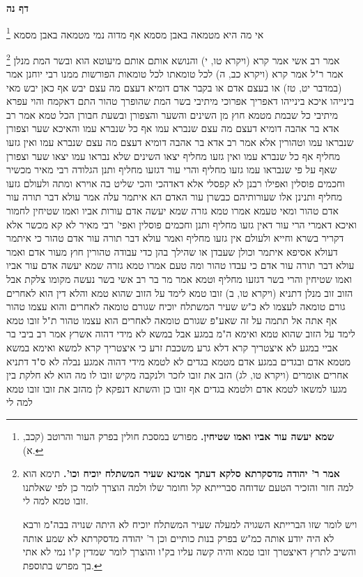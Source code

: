 \documentclass[12pt, openany]{book}
\newcommand{\sethebfont}{
\fontsize{10.5pt}{21.0pt} \selectfont
}
\newcommand{\twocol}[1]{
	{\sethebfont \begin{multicols}{2}
			#1
	\end{multicols}}	
}
\newcommand{\sectname}{}
\newcommand{\newsection}[1]{
	\addcontentsline{toc}{section}{#1}
	\renewcommand{\sectname}{#1}	
	\vspace{-\baselineskip}
	\begin{center}
		\textbf{%
\fontsize{16pt}{16pt}\selectfont
			#1}
	\end{center}
	\vspace{-\baselineskip}
	\nopagebreak
}
\newcommand{\footnotecomment}[1]{
	\renewcommand\thefootnote{}
	\footnote{#1}}
\newcommand{\commenta}[1]{\footnotecomment{#1}}
\begin{document}
\newsection{דף נה}
\twocol{
\commenta{\textbf{שמא יעשה עור אביו ואמו שטיחין.} מפורש במסכת חולין בפרק העור והרוטב (קכב, א). }
אי מה היא מטמאה באבן מסמא אף מדוה נמי מטמאה באבן מסמא 
\commenta{\textbf{אמר ר' יהודה מדסקרתא סלקא דעתך אמינא שעיר המשתלח יוכיח וכו'.} תימא הוא למה חזר והזכיר הטעם שדוחה סברייתא קל וחומר שלו ולמה הוצרך לומר כן לפי שאלתנו זובו טמא למה לי.\par ויש לומר שזו הברייתא השגויה למעלה שעיר המשתלח יוכיח לא היתה שנויה בבה"מ ורבא לא היה יודע אותה כמ"ש בפרק בנות כותיים וכן ר' יהודה מדסקרתא לא שמע אותה והשיב לתרץ דאיצטרך זובו טמא והיה קשה עליו בק"ו והוצרך לומר שמדין ק"ו נמי לא אתי בך מפרש בתוספת. }
אמר רב אשי אמר קרא (ויקרא טו, י) והנושא אותם אותם מיעוטא הוא
ובשר המת מנלן אמר ר"ל אמר קרא (ויקרא כב, ה) לכל טומאתו לכל טומאות הפורשות ממנו 
רבי יוחנן אמר (במדבר יט, טז) או בעצם אדם או בקבר אדם דומיא דעצם מה עצם יבש אף כאן יבש 
מאי בינייהו איכא בינייהו דאפריך אפרוכי 
מיתיבי בשר המת שהופרך טהור התם דאקמח והוי עפרא 
מיתיבי כל שבמת מטמא חוץ מן השינים והשער והצפורן ובשעת חבורן הכל טמא 
אמר רב אדא בר אהבה דומיא דעצם מה עצם שנברא עמו אף כל שנברא עמו והאיכא שער וצפורן שנבראו עמו וטהורין 
אלא אמר רב אדא בר אהבה דומיא דעצם מה עצם שנברא עמו ואין גזעו מחליף אף כל שנברא עמו ואין גזעו מחליף יצאו השינים שלא נבראו עמו יצאו שער וצפורן שאף על פי שנבראו עמו גזעו מחליף 
והרי עור דגזעו מחליף ותנן הגלודה רבי מאיר מכשיר וחכמים פוסלין ואפילו רבנן לא קפסלי אלא דאדהכי והכי שליט בה אוירא ומתה ולעולם גזעו מחליף ותנינן אלו שעורותיהם כבשרן עור האדם 
הא איתמר עלה אמר עולא דבר תורה עור אדם טהור ומאי טעמא אמרו טמא גזרה שמא יעשה אדם עורות אביו ואמו שטיחין לחמור 
ואיכא דאמרי הרי עור דאין גזעו מחליף ותנן וחכמים פוסלין ואפי' רבי מאיר לא קא מכשר אלא דקריר בשרא וחייא ולעולם אין גזעו מחליף ואמר עולא דבר תורה עור אדם טהור 
כי איתמר דעולא אסיפא איתמר וכולן שעבדן או שהילך בהן כדי עבודה טהורין חוץ מעור אדם ואמר עולא דבר תורה עור אדם כי עבדו טהור ומה טעם אמרו טמא גזרה שמא יעשה אדם עור אביו ואמו שטיחין 
והרי בשר דגזעו מחליף וטמא אמר מר בר רב אשי בשר נעשה מקומו צלקת
אבל הזוב זוב מנלן דתניא (ויקרא טו, ב) זובו טמא לימד על הזוב שהוא טמא 
והלא דין הוא לאחרים גורם טומאה לעצמו לא כ"ש שעיר המשתלח יוכיח שגורם טומאה לאחרים והוא עצמו טהור אף אתה אל תתמה על זה שאע"פ שגורם טומאה לאחרים הוא עצמו טהור ת"ל זובו טמא לימד על הזוב שהוא טמא 
ואימא ה"מ במגע אבל במשא לא מידי דהוה אשרץ אמר רב ביבי בר אביי במגע לא איצטריך קרא דלא גרע משכבת זרע
כי איצטריך קרא למשא ואימא במשא מטמא אדם ובגדים במגע אדם מטמא בגדים לא לטמא מידי דהוה אמגע נבלה 
לא ס"ד דתניא אחרים אומרים (ויקרא טו, לג) הזב את זובו לזכר ולנקבה מקיש זובו לו מה הוא לא חלקת בין מגעו למשאו לטמא אדם ולטמא בגדים אף זובו כן 
והשתא דנפקא לן מהזב את זובו זובו טמא למה לי 
}
\end{document}
